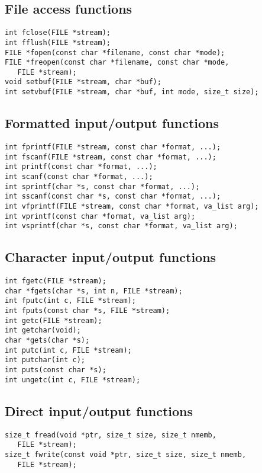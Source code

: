 \documentclass[a4paper,11pt,draft]{article}
\begin{document}
\subsection*{File access functions}

\begin{verbatim}
int fclose(FILE *stream);
int fflush(FILE *stream);
FILE *fopen(const char *filename, const char *mode);
FILE *freopen(const char *filename, const char *mode,
   FILE *stream);
void setbuf(FILE *stream, char *buf);
int setvbuf(FILE *stream, char *buf, int mode, size_t size);
\end{verbatim}

\subsection*{Formatted input/output functions}

\begin{verbatim}
int fprintf(FILE *stream, const char *format, ...);
int fscanf(FILE *stream, const char *format, ...);
int printf(const char *format, ...);
int scanf(const char *format, ...);
int sprintf(char *s, const char *format, ...);
int sscanf(const char *s, const char *format, ...);
int vfprintf(FILE *stream, const char *format, va_list arg);
int vprintf(const char *format, va_list arg);
int vsprintf(char *s, const char *format, va_list arg);
\end{verbatim}

\subsection*{Character input/output functions}

\begin{verbatim}
int fgetc(FILE *stream);
char *fgets(char *s, int n, FILE *stream);
int fputc(int c, FILE *stream);
int fputs(const char *s, FILE *stream);
int getc(FILE *stream);
int getchar(void);
char *gets(char *s);
int putc(int c, FILE *stream);
int putchar(int c);
int puts(const char *s);
int ungetc(int c, FILE *stream);
\end{verbatim}

\subsection*{Direct input/output functions}

\begin{verbatim}
size_t fread(void *ptr, size_t size, size_t nmemb,
   FILE *stream);
size_t fwrite(const void *ptr, size_t size, size_t nmemb,
   FILE *stream);
\end{verbatim}
\end{document}
